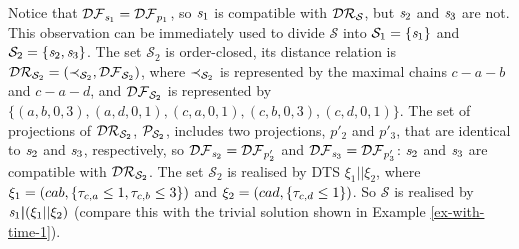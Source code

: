 \noindent
Notice that $\mathcal{DF}_{\mathit{s}_1}=\mathcal{DF}_{p_1}$, so $\mathit{s}_1$ is compatible with
$\mathcal{DR}_{\mathcal{S}}$, but $\mathit{s}_2$ and $\mathit{s}_3$ are not.
This observation can be immediately used to divide $\mathcal{S}$
into
$\mathcal{S}_1=\{\mathit{s}_1\}$ and
$\mathcal{S}_2=\{\mathit{s}_2,\mathit{s}_3\}$.
The set $\mathcal{S}_2$ is order-closed,
its distance relation is
$\mathcal{DR}_{\mathcal{S}_2}=(\prec_{\mathcal{S}_2},\mathcal{DF}_{\mathcal{S}_2})$, where
$\prec_{\mathcal{S}_2}$ is represented by the maximal chains $c-a-b$
and $c-a-d$, and $\mathcal{DF}_{\mathcal{S}_2}$ is represented by
 $\{
(a, b, 0, 3),
(a, d, 0, 1),
(c, a, 0, 1),
(c, b, 0, 3),
(c, d, 0, 1)\}$.
The set of projections of $\mathcal{DR}_{\mathcal{S}_2}$,
$\mathcal{P}_{\mathcal{S}_2}$, includes two projections, $p'_2$ and $p'_3$,
that
are identical to $\mathit{s}_2$ and $\mathit{s}_3$, respectively, so
$\mathcal{DF}_{\mathit{s}_2}=\mathcal{DF}_{p'_2}$ and $\mathcal{DF}_{\mathit{s}_3}=\mathcal{DF}_{p'_3}$:
$\mathit{s}_2$ and $\mathit{s}_3$ are compatible with $\mathcal{DR}_{\mathcal{S}_2}$.
The set $\mathcal{S}_2$ is realised by DTS $\xi_1||\xi_2$, where
$\xi_1=(cab,\{\tau_{c,a}\leq 1,\tau_{c,b}\leq
3\})$ and $\xi_2=(cad,\{\tau_{c,d}\leq 1\})$.
So ${\mathcal{S}}$ is realised by $\mathit{s}_1\boldsymbol{|}(\xi_1||\xi_2)$
(compare this with the trivial solution shown in Example \ref{ex-with-time-1}).

